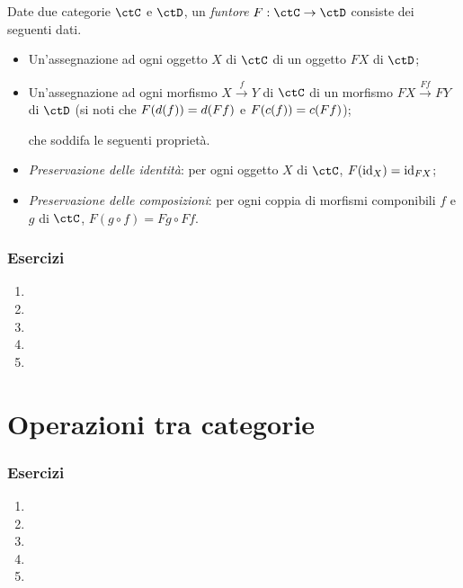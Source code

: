 \begin{definition}
 Date due categorie $\ctC$ e $\ctD$, un \emph{funtore} $F:\ctC\to\ctD$ consiste dei seguenti dati.
 \begin{itemize}
  \item Un'assegnazione ad ogni oggetto $X$ di $\ctC$ di un oggetto $FX$ di $\ctD$;
  \item Un'assegnazione ad ogni morfismo $X \xrightarrow{f} Y$ di $\ctC$ di un morfismo $FX \xrightarrow{Ff} FY$ di $\ctD$ (si noti che $F(d(f))=d(Ff)$ e $F(c(f))=c(Ff)$);
  
  che soddifa le seguenti proprietà.
  \item \emph{Preservazione delle identità}: per ogni oggetto $X$ di $\ctC$, $F(\mathrm{id}_X)=\mathrm{id}_{FX}$;
  \item \emph{Preservazione delle composizioni}: per ogni coppia di morfismi componibili $f$ e $g$ di $\ctC$, $F(g\circ f)=Fg\circ Ff$.
 \end{itemize}
\end{definition}




\subsubsection*{Esercizi}
\begin{enumerate}
    \item 
    \item 
    \item 
    \item 
    \item 
\end{enumerate}


\section{Operazioni tra categorie}


\subsubsection*{Esercizi}
\begin{enumerate}
    \item 
    \item 
    \item 
    \item 
    \item 
\end{enumerate}


